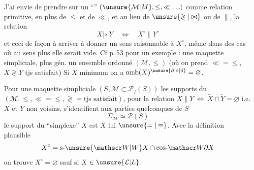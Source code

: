 
J'ai envie de prendre sur un ``'' $(\unsure{\mathcal M|M},\leq,\ll\ldots)$ comme relation primitive, en plus de $\leq$ et de $\ll$, et au lieu de $\unsure{\gtrless|\bowtie}$ ou de $\parallel$, la  relation
\[
X\mathrel{|\circ|}Y\quad\Longleftrightarrow\quad X^{\circ}\parallel Y^{\circ}
\]
et ceci de façon à arriver à donner un sens raisonnable à $X^{\circ}$, même dans des cas où au sens plus   elle serait vide.  Cf p.\,53 pour un exemple :  une maquette simpliciale, plus gén. un ensemble ordonné $(\mathcal M,\leq)$ (où on prend $\ll=\leq$, $X\gtrless Y$ tjs satisfait)  Si $X$  minimum on a $\operatorname{omb}(X)^{\unsure{\partial|\circ|d}}=\varnothing$.

Pour une maquette simpliciale $(S,\mathcal M\subset\mathscr P_f(S))$ les supports du $(\mathcal M,\leq,\ll=\leq,\gtrless=\text{tjs satisfait})$, pour la relation $X\parallel Y\ \Longleftrightarrow\ \widetilde X\cap\widetilde Y=\varnothing$ i.e. $X$ et $Y$ non voisins, s'identifient aux parties quelconques de $S$
\[
\Sigma_{\mathcal M}\simeq\mathscr P(S)
\]
le support du  ``simplexe'' $X$ est $X$ lui $\unsure{=|\equiv}$. Avec la définition plausible
\[
X^{\circ}=\mathrm{s}\text{-}\unsure{\mathscr W|W}X\cap\mathrm{cos}\text{-}\mathscr W\partial X
\]
on trouve $X^{\circ}=\varnothing$ sauf si $X$  $\in\unsure{\mathcal L|L}$.

